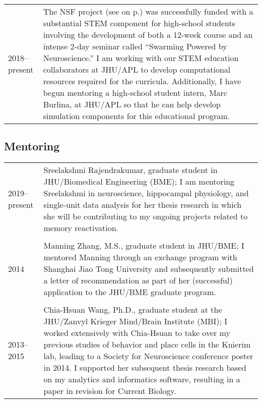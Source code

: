 \documentclass[10pt]{article}
\begin{document}
\begin{tabular}{@{\hspace{0.2in}}l>{\raggedright\arraybackslash}p{}}
  2018--present \hspace{0.1in} & The NSF project (see
  \emph{\nameref{sec:cursupport}} on p.\pageref{sec:cursupport}) was
  successfully funded with a substantial STEM component for high-school students
  involving the development of both a 12-week course and an intense 2-day
  seminar called ``Swarming Powered by Neuroscience.'' I am working with our
  STEM education collaborators at JHU/APL to develop computational resources
  required for the curricula. Additionally, I have begun mentoring a high-school
  student intern, Marc Burlina, at JHU/APL so that he can help develop
  simulation components for this educational program.
\end{tabular}

\subsection*{Mentoring}

\begin{tabular}{@{\hspace{0.2in}}l>{\raggedright\arraybackslash}p{}}
  2019--present \hspace{0.1in} & Sreelakshmi Rajendrakumar, graduate student in
  JHU/Biomedical Engineering (BME); I am mentoring Sreelakshmi in neuroscience,
  hippocampal physiology, and single-unit data analysis for her thesis research
  in which she will be contributing to my ongoing projects related to memory
  reactivation.\\
  \tabularnewline
  2014 & Manning Zhang, M.S., graduate student in JHU/BME; I mentored Manning
  through an exchange program with Shanghai Jiao Tong University and
  subsequently submitted a letter of recommendation as part of her (successful)
  application to the JHU/BME graduate program.\\
  \tabularnewline
  2013--2015 & Chia-Hsuan Wang, Ph.D., graduate student at the JHU/Zanvyl
  Krieger Mind/Brain Institute (MBI); I worked extensively with Chia-Hsuan to
  take over my previous studies of behavior and place cells in the Knierim lab,
  leading to a Society for Neuroscience conference poster in 2014. I supported
  her subsequent thesis research based on my analytics and informatics software,
  resulting in a paper in revision for Current Biology.\\
\end{tabular}
\end{document}
